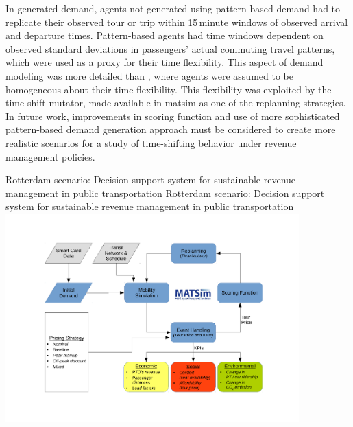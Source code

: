 In generated demand, agents not generated using pattern-based demand had to replicate their observed tour or trip within 15\,minute windows of observed arrival and departure times. Pattern-based agents had time windows dependent on observed standard deviations in passengers' actual commuting travel patterns, which were used as a proxy for their time flexibility. This aspect of demand modeling was more detailed than \citet[][]{LovricEtAl_DSS_2013}, where agents were assumed to be homogeneous about their time flexibility. This flexibility was exploited by the time shift mutator, made available in \gls{matsim} as one of the \gls{replanning} strategies. In future work, improvements in scoring function and use of more sophisticated pattern-based demand generation approach must be considered to create more realistic scenarios for a study of time-shifting behavior under revenue management policies.

\createfigure%
{Rotterdam scenario: Decision support system for sustainable revenue management in public transportation}%
{Rotterdam scenario: Decision support system for sustainable revenue management in public transportation}%
{\label{fig:rotterdam}}%
{\includegraphics[width=0.85\textwidth, angle=0]{./using/figures/rotterdam}}%
{}


